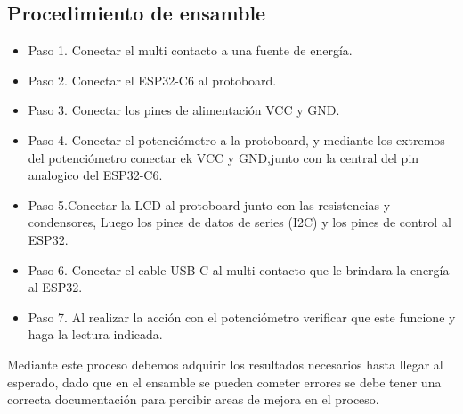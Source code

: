     \subsection{Procedimiento de ensamble}
    \begin{itemize}
        \item Paso 1. Conectar el multi contacto a una fuente de energía.
        \item Paso 2. Conectar el ESP32-C6 al protoboard.
        \item Paso 3. Conectar los pines de alimentación VCC y GND.
        \item Paso 4. Conectar el potenciómetro a la protoboard, y mediante los extremos del potenciómetro conectar ek VCC y GND,junto con la central del pin analogico del ESP32-C6.
        \item Paso 5.Conectar la LCD al protoboard junto con las resistencias y condensores, Luego los pines de datos de series (I2C) y los pines de control al ESP32.
        \item Paso 6. Conectar el cable USB-C al multi contacto que le brindara la energía al ESP32.
        \item Paso 7. Al realizar la acción con el potenciómetro verificar que este funcione y haga la lectura indicada. 
    \end{itemize}
    Mediante este proceso debemos adquirir los resultados necesarios hasta llegar al esperado, dado que en el ensamble se pueden cometer errores se debe tener una correcta documentación para percibir areas de mejora en el proceso.
        
    
    
